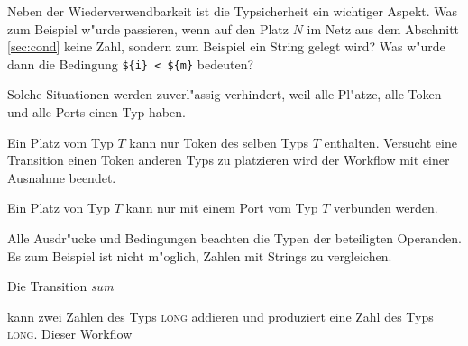 \documentclass[a4paper,12pt]{article}
\newlength{\st}\setlength{\st}{0pt}
\newcommand{\type}[1]{\textsc{#1}}
\newcommand{\expression}[1]{\texttt{#1}}
\begin{document}
Neben der Wiederverwendbarkeit ist die Typsicherheit ein wichtiger
Aspekt. Was zum Beispiel w"urde passieren, wenn auf den Platz $N$ im
Netz aus dem Abschnitt \ref{sec:cond} keine Zahl, sondern zum Beispiel
ein String gelegt wird? Was w"urde dann die Bedingung \expression{\$\{i\}
  < \$\{m\}} bedeuten?

Solche Situationen werden zuverl"assig verhindert, weil alle Pl"atze,
alle Token und alle Ports einen Typ haben.

Ein Platz vom Typ $T$ kann nur Token des selben Typs $T$
enthalten. Versucht eine Transition einen Token anderen Typs zu
platzieren wird der Workflow mit einer Ausnahme beendet.

Ein Platz von Typ $T$ kann nur mit einem Port vom Typ $T$ verbunden
werden.

Alle Ausdr"ucke und Bedingungen beachten die Typen der beteiligten
Operanden. Es zum Beispiel ist nicht m"oglich, Zahlen mit Strings zu
vergleichen.

Die Transition \emph{sum}

\begin{center}\end{center}

kann zwei Zahlen des Typs \type{long} addieren und produziert eine
Zahl des Typs \type{long}. Dieser Workflow

\begin{center}\end{center}
\end{document}
